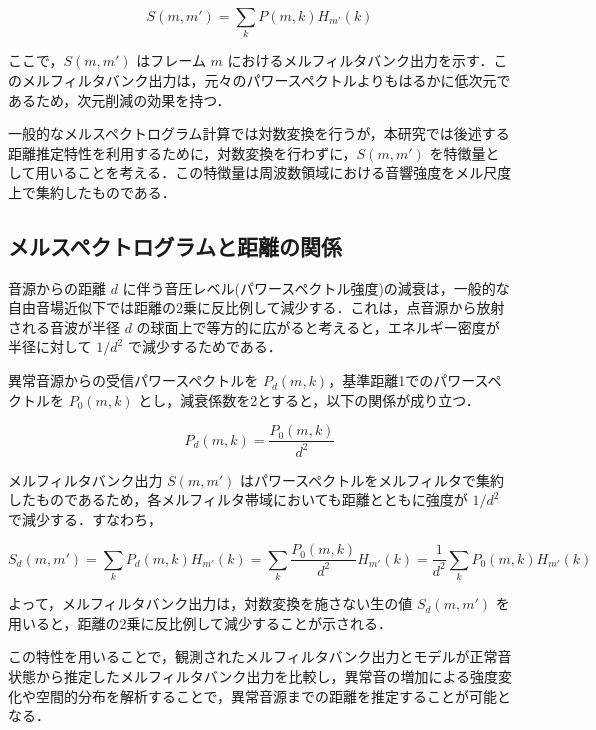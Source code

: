 \documentclass[../main]{subfiles}
\begin{document}
\[
S(m, m') = \sum_{k} P(m, k) H_{m'}(k)
\]

ここで，$S(m, m')$ はフレーム $m$ におけるメルフィルタバンク出力を示す．このメルフィルタバンク出力は，元々のパワースペクトルよりもはるかに低次元であるため，次元削減の効果を持つ．

一般的なメルスペクトログラム計算では対数変換を行うが，本研究では後述する距離推定特性を利用するために，対数変換を行わずに，$S(m, m')$ を特徴量として用いることを考える．この特徴量は周波数領域における音響強度をメル尺度上で集約したものである．



\subsection{メルスペクトログラムと距離の関係}

音源からの距離 $d$ に伴う音圧レベル(パワースペクトル強度)の減衰は，一般的な自由音場近似下では距離の2乗に反比例して減少する．これは，点音源から放射される音波が半径 $d$ の球面上で等方的に広がると考えると，エネルギー密度が半径に対して $1/d^2$ で減少するためである．

異常音源からの受信パワースペクトルを $P_d(m, k)$，基準距離1でのパワースペクトルを $P_0(m, k)$ とし，減衰係数を2とすると，以下の関係が成り立つ．

\[
P_d(m, k) = \frac{P_0(m, k)}{d^2}
\]

メルフィルタバンク出力 $S(m, m')$ はパワースペクトルをメルフィルタで集約したものであるため，各メルフィルタ帯域においても距離とともに強度が $1/d^2$ で減少する．すなわち，

\[
S_d(m, m') = \sum_{k} P_d(m, k) H_{m'}(k) = \sum_{k} \frac{P_0(m, k)}{d^2} H_{m'}(k) = \frac{1}{d^2} \sum_{k} P_0(m, k) H_{m'}(k)
\]

よって，メルフィルタバンク出力は，対数変換を施さない生の値 $S_d(m, m')$ を用いると，距離の2乗に反比例して減少することが示される．

この特性を用いることで，観測されたメルフィルタバンク出力とモデルが正常音状態から推定したメルフィルタバンク出力を比較し，異常音の増加による強度変化や空間的分布を解析することで，異常音源までの距離を推定することが可能となる．
\label{sec:pmethod_preprocessing}
\end{document}
